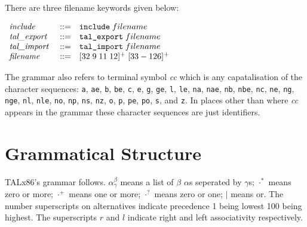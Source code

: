 \documentclass{article}
\newcommand{\tal}{{\sf TALx86}}
\newenvironment{gramrule}
  {\begin{flushleft}$\begin{array}{p{0.7in}ll}}
  {\end{array}$\end{flushleft}}
\newcommand{\term}[1]{{\it#1}}
\newcommand{\ts}[1]{\hbox{\tt#1}}
\newcommand{\alt}{\mathrel{|}}
\begin{document}
There are three filename keywords given below:
\begin{gramrule}
\term{include} &::=& \ts{include}\;filename \\
\term{tal\_export} &::=& \ts{tal\_export}\;filename \\
\term{tal\_import} &::=& \ts{tal\_import}\;filename \\
\term{filename} &::=& [32\;9\;11\;12]^+ \; [33-126]^+ \\
\end{gramrule}

The grammar also refers to terminal symbol \term{cc} which is any
capatalisation of the character sequences: \ts{a}, \ts{ae}, \ts{b}, \ts{be},
\ts{c}, \ts{e}, \ts{g}, \ts{ge}, \ts{l}, \ts{le}, \ts{na}, \ts{nae}, \ts{nb},
\ts{nbe}, \ts{nc}, \ts{ne}, \ts{ng}, \ts{nge}, \ts{nl}, \ts{nle}, \ts{no},
\ts{np}, \ts{ns}, \ts{nz}, \ts{o}, \ts{p}, \ts{pe}, \ts{po}, \ts{s}, and
\ts{z}.  In places other than where \term{cc} appears in the grammar these
character sequences are just identifiers.
\newpage
\section{Grammatical Structure}
\tal's grammar follows.  $\alpha^\beta_\gamma$ means a list of $\beta$
$\alpha$s seperated by $\gamma$s; $\cdot^*$ means zero or more; $\cdot^+$ means
one or more; $\cdot^?$ means zero or one; $\alt$ means or.  The
number superscripts on alternatives indicate precedence 1 being lowest
100 being highest.  The superscripts $r$ and $l$ indicate right and
left associativity respectively.
\end{document}
